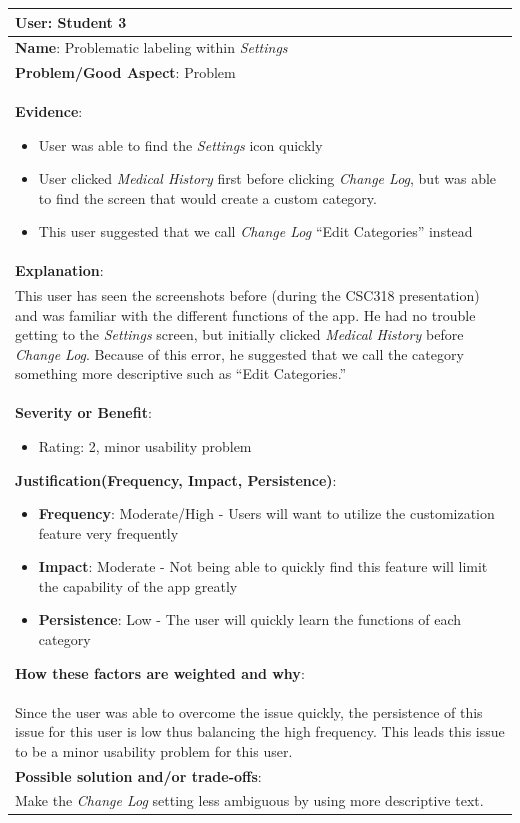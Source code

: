 \documentclass[pdftex,12pt,a4paper]{report}
\begin{document}
\begin{center}
	\begin{longtable}{|p{\textwidth}|}
	\hline
	\textbf{User}: Student 3\\
	\hline
	\textbf{Name}: Problematic labeling within \emph{Settings}\\
	\hline
	\textbf{Problem/Good Aspect}: Problem\\
	\hline
	\textbf{Evidence}:
	\begin{itemize}
	\item{User was able to find the \emph{Settings} icon quickly}
	\item{User clicked \emph{Medical History} first before clicking \emph{Change Log}, but was able to find the screen that would create a custom category.}
	\item{This user suggested that we call \emph{Change Log} ``Edit Categories'' instead}
	\end{itemize}\\
	\hline
	\textbf{Explanation}:\\This user has seen the screenshots before (during the CSC318 presentation) and was familiar with the different functions of the app. He had no trouble getting to the \emph{Settings} screen, but initially clicked \emph{Medical History} before \emph{Change Log}. Because of this error, he suggested that we call the category something more descriptive such as ``Edit Categories.''\\
	\hline
\textbf{Severity or Benefit}:
	\begin{itemize}
	\item{Rating: 2, minor usability problem}
	\end{itemize}
	\textbf{Justification(Frequency, Impact, Persistence)}:
	\begin{itemize}
	\item{\textbf{Frequency}:} Moderate/High - Users will want to utilize the customization feature very frequently
	\item{\textbf{Impact}:} Moderate - Not being able to quickly find this feature will limit the capability of the app greatly
	\item{\textbf{Persistence}:} Low - The user will quickly learn the functions of each category
	\end{itemize}
	\textbf{How these factors are weighted and why}:\\
	Since the user was able to overcome the issue quickly, the persistence of this issue for this user is low thus balancing the high frequency. This leads this issue to be a minor usability problem for this user.\\
	\hline
	\textbf{Possible solution and/or trade-offs}:\\
	Make the \emph{Change Log} setting less ambiguous by using more descriptive text.\\
	\hline
	\end{longtable}
\end{center}
\end{document}
